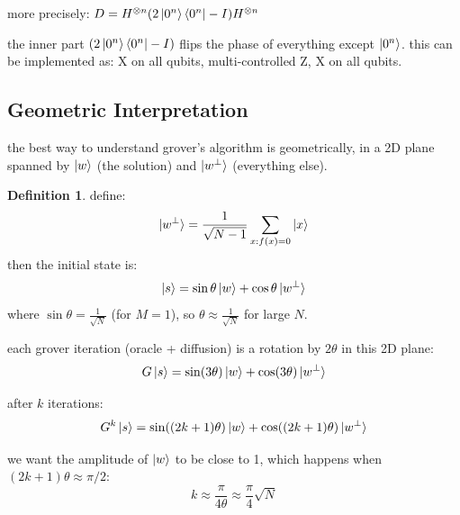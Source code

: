 \documentclass[11pt,a4paper]{article}
\theoremstyle{definition}
\newtheorem{definition}{Definition}[section]
\theoremstyle{remark}
\begin{document}
more precisely: $D = H^{\otimes n}(2\ket{0^n}\bra{0^n} - I)H^{\otimes n}$

the inner part $(2\ket{0^n}\bra{0^n} - I)$ flips the phase of everything except $\ket{0^n}$. this can be implemented as: X on all qubits, multi-controlled Z, X on all qubits.

\subsection{Geometric Interpretation}

the best way to understand grover's algorithm is geometrically, in a 2D plane spanned by $\ket{w}$ (the solution) and $\ket{w^\perp}$ (everything else).

\begin{definition}
define:
\[
\ket{w^\perp} = \frac{1}{\sqrt{N-1}}\sum_{x: f(x)=0}\ket{x}
\]
then the initial state is:
\[
\ket{s} = \sin\theta\ket{w} + \cos\theta\ket{w^\perp}
\]
where $\sin\theta = \frac{1}{\sqrt{N}}$ (for $M = 1$), so $\theta \approx \frac{1}{\sqrt{N}}$ for large $N$.
\end{definition}

\begin{center}
\end{center}

each grover iteration (oracle + diffusion) is a rotation by $2\theta$ in this 2D plane:
\[
G\ket{s} = \sin(3\theta)\ket{w} + \cos(3\theta)\ket{w^\perp}
\]

after $k$ iterations:
\[
G^k\ket{s} = \sin((2k+1)\theta)\ket{w} + \cos((2k+1)\theta)\ket{w^\perp}
\]

we want the amplitude of $\ket{w}$ to be close to 1, which happens when $(2k+1)\theta \approx \pi/2$:
\[
\boxed{k \approx \frac{\pi}{4\theta} \approx \frac{\pi}{4}\sqrt{N}}
\]
\end{document}
